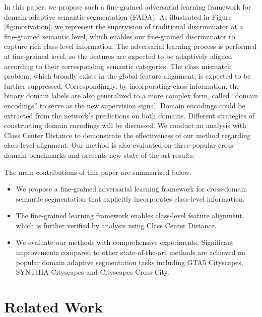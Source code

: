\documentclass[runningheads]{llncs}
\begin{document}
In this paper, we propose such a fine-grained adversarial learning framework for domain adaptive semantic segmentation (FADA). As illustrated in Figure \ref{fig:motivation}, we represent the supervision of traditional discriminator at a fine-grained semantic level, which enables our fine-grained discriminator to capture rich class-level information. The adversarial learning process is performed at fine-grained level, so the features are expected to be adaptively aligned according to their corresponding semantic categories. The class mismatch problem, which broadly exists in the global feature alignment, is expected to be further suppressed. Correspondingly, by incorporating class information, the binary domain labels are also generalized to a more complex form, called ``domain encodings'' to serve as the new supervision signal. Domain encodings could be extracted from the network's predictions on both domains. Different strategies of constructing domain encodings will be discussed. We conduct an analysis with Class Center Distance to demonstrate the effectiveness of our method regarding class-level alignment. Our method is also evaluated on three popular cross-domain benchmarks and presents new state-of-the-art results.





The main contributions of this paper are summarized below.
\begin{itemize}
  \item We propose a fine-grained adversarial learning framework for cross-domain semantic segmentation that explicitly incorporates class-level information.
  
  \item The fine-grained learning framework enables class-level feature alignment, which is further verified by analysis using Class Center Distance. 
  
  \item We evaluate our methods with comprehensive experiments. Significant improvements compared to other state-of-the-art methods are achieved on popular domain adaptive segmentation tasks including GTA5  Cityscapes, SYNTHIA  Cityscapes and Cityscapes  Cross-City.
\end{itemize}



%
 
\section{Related Work}
\end{document}
